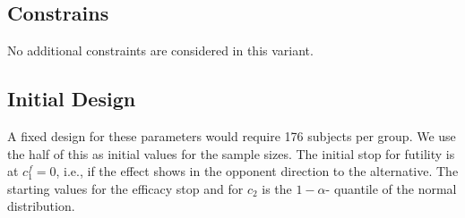 \documentclass[]{book}
\newenvironment{Shaded}{\begin{snugshade}}{\end{snugshade}}
\newcommand{\ControlFlowTok}[1]{\textcolor[rgb]{0.13,0.29,0.53}{\textbf{#1}}}
\newcommand{\DataTypeTok}[1]{\textcolor[rgb]{0.13,0.29,0.53}{#1}}
\newcommand{\DecValTok}[1]{\textcolor[rgb]{0.00,0.00,0.81}{#1}}
\newcommand{\FloatTok}[1]{\textcolor[rgb]{0.00,0.00,0.81}{#1}}
\newcommand{\KeywordTok}[1]{\textcolor[rgb]{0.13,0.29,0.53}{\textbf{#1}}}
\newcommand{\NormalTok}[1]{#1}
\newcommand{\OperatorTok}[1]{\textcolor[rgb]{0.81,0.36,0.00}{\textbf{#1}}}
\newcommand{\StringTok}[1]{\textcolor[rgb]{0.31,0.60,0.02}{#1}}
\begin{document}
\hypertarget{constrains-10}{%
\subsection{Constrains}\label{constrains-10}}

No additional constraints are considered in this variant.

\hypertarget{initial-design-8}{%
\subsection{Initial Design}\label{initial-design-8}}

A fixed design for these parameters would require
176
subjects per group. We use the half of this as initial values for the
sample sizes.
The initial stop for futility is at \(c_1^f=0\), i.e., if the effect shows
in the opponent direction to the alternative.
The starting values for the efficacy stop and for \(c_2\) is the \(1-\alpha\)-
quantile of the normal distribution.

\begin{Shaded}
\end{Shaded}
\end{document}
